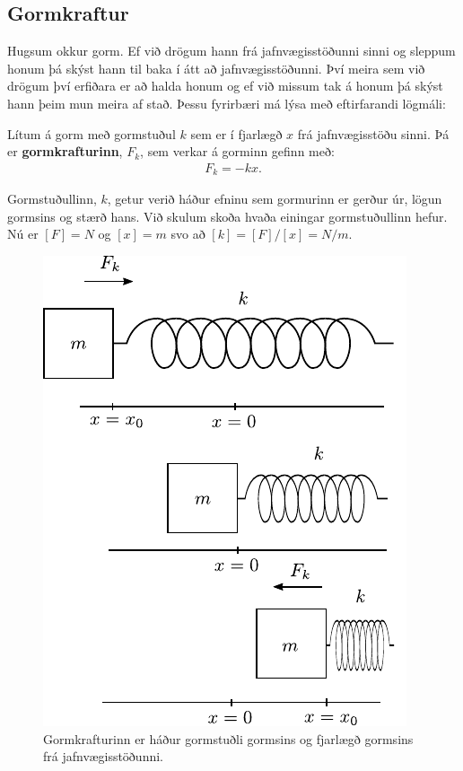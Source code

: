 \ifdefined \wholebook \else\documentclass[oneside]{book}\usepackage{EdlBook}\graphicspath{{figures/}}
\begin{document}
\subsection*{Gormkraftur}

Hugsum okkur gorm. Ef við drögum hann frá jafnvægisstöðunni sinni og sleppum honum þá skýst hann til baka í átt að jafnvægisstöðunni. Því meira sem við drögum því erfiðara er að halda honum og ef við missum tak á honum þá skýst hann þeim mun meira af stað. Þessu fyrirbæri má lýsa með eftirfarandi lögmáli:
\begin{tcolorbox}
\begin{definition}
Lítum á gorm með gormstuðul $k$ sem er í fjarlægð $x$ frá jafnvægisstöðu sinni. Þá er \textbf{gormkrafturinn}, $F_k$, sem verkar á gorminn gefinn með:
\begin{align*}
    F_k = -kx.
\end{align*}
\end{definition}
\end{tcolorbox}
Gormstuðullinn, $k$, getur verið háður efninu sem gormurinn er gerður úr, lögun gormsins og stærð hans. Við skulum skoða hvaða einingar gormstuðullinn hefur. Nú er $\left[ F \right] = \si{N}$ og $\left[x \right] = \si{m}$ svo að $\left[ k \right] = \left[F\right]/ \left[ x \right] = \si{N/m}$.

\begin{figure}[H]
    \centering
    \includegraphics{figures/gormur.pdf}
    \caption{Gormkrafturinn er háður gormstuðli gormsins og fjarlægð gormsins frá jafnvægisstöðunni.}
    \label{fig:gormur.pdf}
\end{figure}
\end{document}
